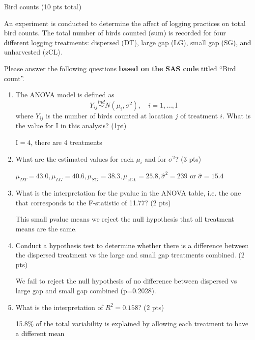 \documentclass[10pt,draft]{article}
\newcommand{\bigbrk}{\vspace*{2in}}
\newcommand{\longcorrect}[2][\bigbrk]{{\color{red} #2}}
\newcommand{\longcorrect}[2][\bigbrk]{#1}
\begin{document}
\newpage
\noindent \begin{Large}Bird counts (10 pts total) \end{Large}

An experiment is conducted to determine the affect of logging practices on total bird counts. The total number of birds counted (sum) is recorded for four different logging treatments: dispersed (DT), large gap (LG), small gap (SG), and unharvested (zCL). 

Please answer the following questions {\bf based on the SAS code} titled ``Bird count''.

\begin{enumerate}
\item The ANOVA model is defined as 
\[ Y_{ij} \stackrel{ind}{\sim} N(\mu_i, \sigma^2), \quad i=1,\ldots,\mathrm{I} \]
where $Y_{ij}$ is the number of birds counted at location $j$ of treatment $i$. What is the value for $\mathrm{I}$ in this analysis? (1pt)

\longcorrect[\vspace*{0.5in}]{$\mathrm{I}=4$, there are 4 treatments}

\item What are the estimated values for each $\mu_i$ and for $\sigma^2$? (3 pts)

\longcorrect{$\mu_{DT} = 43.0, \mu_{LG}=40.6, \mu_{SG} = 38.3, \mu_{zCL}=25.8, \hat{\sigma}^2=239$ or $ \hat{\sigma}=15.4$ }

\item What is the interpretation for the pvalue in the ANOVA table, i.e. the one that corresponds to the F-statistic of 11.77? (2 pts)

\longcorrect[\vspace*{1in}]{This small pvalue means we reject the null hypothesis that all treatment means are the same.}

\item Conduct a hypothesis test to determine whether there is a difference between the dispersed treatment vs the large and small gap treatments combined. (2 pts)

\longcorrect[\vspace*{1.2in}]{We fail to reject the null hypothesis of no difference between dispersed vs large gap and small gap combined (p=0.2028). }


\item What is the interpretation of $R^2=0.158$? (2 pts)

\longcorrect[\vspace*{1in}]{15.8\% of the total variability is explained by allowing each treatment to have a different mean}


\end{enumerate}
\end{document}
